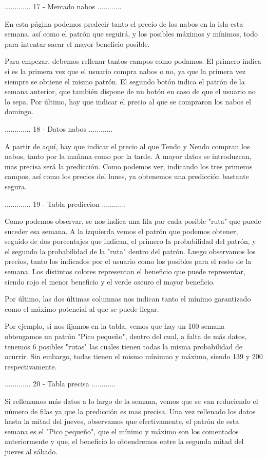 ............. 17 - Mercado nabos ............

En esta página podemos predecir tanto el precio de los nabos en la isla esta semana, así
como el patrón que seguirá, y los posibles máximos y mínimos, todo para intentar sacar el
mayor beneficio posible.

Para empezar, debemos rellenar tantos campos como podamos. El primero indica si es la primera
vez que el usuario compra nabos o no, ya que la primera vez siempre se obtiene el mismo patrón.
El segundo botón indica el patrón de la semana anterior, que también dispone de un botón en
caso de que el usuario no lo sepa. Por último, hay que indicar el precio al que se compraron
los nabos el domingo.

............. 18 - Datos nabos ............

A partir de aquí, hay que indicar el precio al que Tendo y Nendo compran los nabos, tanto
por la mañana como por la tarde. A mayor datos se introduzcan, mas precisa será la predicción.
Como podemos ver, indicando los tres primeros campos, así como los precios del lunes, ya
obtenemos una predicción bastante segura.

............. 19 - Tabla prediccion ............

Como podemos observar, se nos indica una fila por cada posible "ruta" que puede suceder esa semana.
A la izquierda vemos el patrón que podemos obtener, seguido de dos porcentajes que indican,
el primero la probabilidad del patrón, y el segundo la probabilidad de la "ruta" dentro del
patrón. Luego observamos los precios, tanto los indicados por el usuario como los posibles
para el resto de la semana. Los distintos colores representan el beneficio que puede representar,
siendo rojo el menor beneficio y el verde oscuro el mayor beneficio.

Por último, las dos últimas columnas nos indican tanto el mínimo garantizado como el 
máximo potencial al que se puede llegar.

Por ejemplo, si nos fijamos en la tabla, vemos que hay un 100%
semana obtengamos un patrón "Pico pequeño", dentro del cual, a falta de más datos, tenemos 6
posibles "rutas" las cuales tienen todas la misma probabilidad de ocurrir. Sin embargo, todas
tienen el mismo mínimno y máximo, siendo 139 y 200 respectivamente. 

............. 20 - Tabla precisa ............

Si rellenamos más datos a lo largo de la semana, vemos que se van reduciendo el número de filas
ya que la predicción es mas precisa. Una vez rellenado los datos hasta la mitad del jueves,
observamos que efectivamente, el patrón de esta semana es el "Pico pequeño", que el mínimo y 
máximo son los comentados anteriormente y que, el beneficio lo obtendremos entre la segunda mitad del
jueves al sábado.


